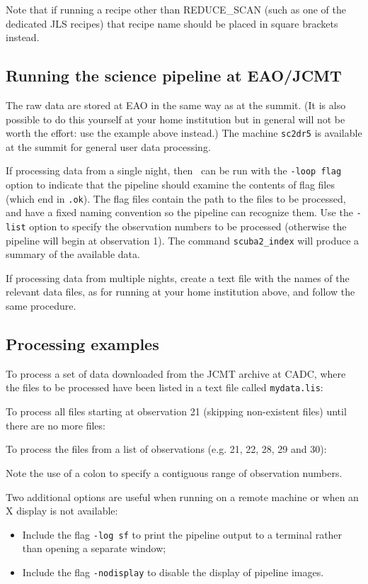 Note that if running a recipe other than REDUCE\_SCAN (such as one of
the dedicated JLS recipes) that recipe name should be placed in square
brackets instead.

\subsection{Running the science pipeline at EAO/JCMT}

The raw data are stored at EAO in the same way as at the summit. (It
is also possible to do this yourself at your home institution but in
general will not be worth the effort: use the example above instead.)
The machine \verb+sc2dr5+ is available at the summit for general user
data processing.

If processing data from a single night, then \oracdr\ can be run with
the \texttt{-loop flag} option to indicate that the pipeline should
examine the contents of flag files (which end in \verb+.ok+). The flag
files contain the path to the files to be processed, and have a fixed
naming convention so the pipeline can recognize them. Use the
\texttt{-list} option to specify the observation numbers to be
processed (otherwise the pipeline will begin at observation 1). The
command \verb+scuba2_index+ will produce a summary of the available
data.

If processing data from multiple nights, create a text file with the
names of the relevant data files, as for running at your home
institution above, and follow the same procedure.

\subsection{Processing examples\label{sse:examples}}

To process a set of data downloaded from the JCMT archive at CADC,
where the files to be processed have been listed in a text file called
\verb+mydata.lis+:
\begin{terminalv}
\end{terminalv}

To process all files starting at observation 21 (skipping non-existent
files) until there are no more files:
\begin{terminalv}
\end{terminalv}

To process the files from a list of observations (e.g. 21, 22, 28, 29 and
30):
\begin{terminalv}
\end{terminalv}
Note the use of a colon to specify a contiguous range of observation
numbers.

Two additional options are useful when running on a remote machine or
when an X display is not available:
\begin{itemize}
\item Include the flag \verb+-log sf+ to print the pipeline output to
  a terminal rather than opening a separate window;
\item Include the flag \verb+-nodisplay+ to disable the display of
  pipeline images.
\end{itemize}

